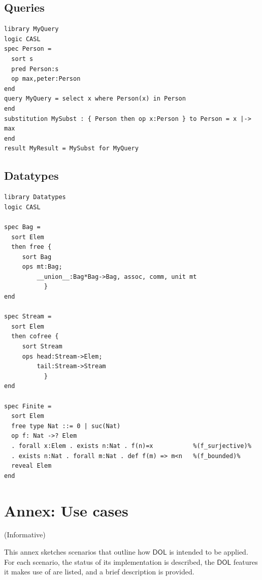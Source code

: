 \documentclass[10pt,fleqn,final]{scrreprt}
\newcommand{\cbs}[0]{\color{red}\xspace} %
\newcommand{\cbe}[0]{\color{black}\xspace} %
\newcommand*{\DOL}{\ensuremath{\mathsf{DOL}}\xspace}
\newcommand{\informative}[0]{{\begin{center}{\Large{(Informative})}\end{center}} \bigskip}
\newcommand{\sclause}[1]{\section{#1}}
\newcommand{\infannex}[1]{ \chapter{Annex: #1}  \informative }
\begin{document}
\sclause{Queries}
\begin{lstlisting}[basicstyle=\ttfamily,language=dolText,morekeywords={props,ObjectProperty,Class,DisjointUnionOf,SubClassOf,Characteristics,Transitive,Asymmetric,SubPropertyOf,DisjointClasses,EquivalentTo,inverse,only,forall,iff,if,or,exists,query,select,where,in,substitution,result,for,along,library,spec,sort,pred,op},escapechar=@,mathescape]
library MyQuery
logic CASL
spec Person =
  sort s
  pred Person:s 
  op max,peter:Person
end
query MyQuery = select x where Person(x) in Person
end
substitution MySubst : { Person then op x:Person } to Person = x |-> max
end
result MyResult = MySubst for MyQuery
\end{lstlisting}

\sclause{Datatypes}

\begin{lstlisting}[basicstyle=\ttfamily,language=dolText,morekeywords={props,ObjectProperty,Class,DisjointUnionOf,SubClassOf,Characteristics,Transitive,Asymmetric,SubPropertyOf,DisjointClasses,EquivalentTo,inverse,only,forall,iff,if,or,exists,sort,ops,in,approximate,extract,free,cofree,spec},escapechar=@,mathescape]
library Datatypes
logic CASL

spec Bag =
  sort Elem
  then free {
     sort Bag
     ops mt:Bag;
         __union__:Bag*Bag->Bag, assoc, comm, unit mt
           }
end

spec Stream =
  sort Elem
  then cofree {
     sort Stream
     ops head:Stream->Elem;
         tail:Stream->Stream
           }
end

spec Finite =
  sort Elem
  free type Nat ::= 0 | suc(Nat)
  op f: Nat ->? Elem
  . forall x:Elem . exists n:Nat . f(n)=x           %(f_surjective)%
  . exists n:Nat . forall m:Nat . def f(m) => m<n   %(f_bounded)%
  reveal Elem
end

\end{lstlisting}

\infannex{Use cases}\label{a:use-cases}

This annex sketches scenarios that outline how \DOL is intended to be applied.  For each scenario,\cbs  the status of its implementation is described, the \DOL features it makes use of are listed, and a brief description is provided.\cbe
\end{document}
